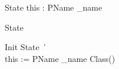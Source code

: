 %
\begin{schema}{State}
 	this : \circref \lpar PName \rpar_{name}
\end{schema}
% 
\begin{circusaction}
\circstate State
\end{circusaction}
%
\begin{schema}{Init}
  State~' \\
  this := \circnew \lpar PName \rpar_{name} Class()
\end{schema}
%
